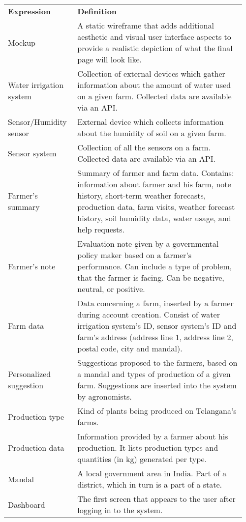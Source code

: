 \begin{center}
    \begin{longtable}{@{}p{0.28\linewidth} p{0.68\linewidth}@{}}
		\toprule
		\textbf{Expression}     & \textbf{Definition}\\
		Mockup					& A static wireframe that adds additional aesthetic and visual user interface aspects to provide a realistic depiction of what the final page will look like.\\
		Water irrigation system & Collection of external devices which gather information about the amount of water used on a given farm. Collected data are available via an API. \\
        Sensor/Humidity sensor 	& External device which collects information about the humidity of soil on a given farm.\\
        Sensor system           & Collection of all the sensors on a farm. Collected data are available via an API.\\
        Farmer's summary        & Summary of farmer and farm data. Contains: information about farmer and his farm, note history, short-term weather forecasts, production data, farm visits, weather forecast history, soil humidity data, water usage, and help requests.\\
        Farmer's note           & Evaluation note given by a governmental policy maker based on a farmer's performance. Can include a type of problem, that the farmer is facing. Can be negative, neutral, or positive.\\
        Farm data               & Data concerning a farm, inserted by a farmer during account creation. Consist of water irrigation system's ID, sensor system's ID and farm's address (address line 1, address line 2, postal code, city and mandal).\\
        Personalized suggestion & Suggestions proposed to the farmers, based on a mandal and types of production of a given farm. Suggestions are inserted into the system by agronomists.\\
        Production type         & Kind of plants being produced on Telangana's farms.\\
        Production data         & Information provided by a farmer about his production. It lists production types and quantities (in kg) generated per type.\\
        Mandal                  & A local government area in India. Part of a district, which in turn is a part of a state.\\
        Dashboard               & The first screen that appears to the user after logging in to the system.\\

\end{longtable}
\end{center}
